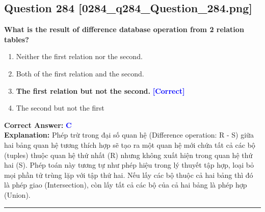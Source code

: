 \documentclass[11pt,a4paper]{article}
\begin{document}
\begin{minipage}{\textwidth}
\subsection*{Question 284 \quad \footnotesize{[0284\_q284\_Question\_284.png]}}
\noindent \textbf{What is the result of difference database operation from 2 relation tables?}

\begin{enumerate}[label=\Alph*.]
    \item Neither the first relation nor the second.
    \item Both of the first relation and the second.
    \item \textbf{The first relation but not the second.} \hfill \textcolor{blue}{\textbf{[Correct]}}
    \item The second but not the first
\end{enumerate}

\noindent \textbf{Correct Answer:} \textcolor{blue}{\textbf{C}} \\[2pt]
\noindent \textbf{Explanation:} Phép trừ trong đại số quan hệ (Difference operation: R - S) giữa hai bảng quan hệ tương thích hợp sẽ tạo ra một quan hệ mới chứa tất cả các bộ (tuples) thuộc quan hệ thứ nhất (R) nhưng không xuất hiện trong quan hệ thứ hai (S). Phép toán này tương tự như phép hiệu trong lý thuyết tập hợp, loại bỏ mọi phần tử trùng lặp với tập thứ hai. Nếu lấy các bộ thuộc cả hai bảng thì đó là phép giao (Intersection), còn lấy tất cả các bộ của cả hai bảng là phép hợp (Union).

\par\vspace{0.3cm}
\hrule
\vspace{0.3cm}
\end{minipage}
\end{document}
